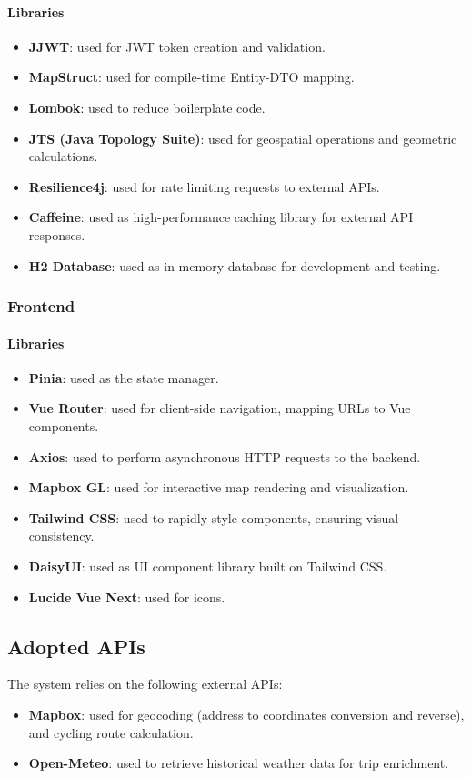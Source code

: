 \paragraph{Libraries}
\begin{itemize}
    \item \textbf{JJWT}: used for JWT token creation and validation.
    \item \textbf{MapStruct}: used for compile-time Entity-DTO mapping.
    \item \textbf{Lombok}: used to reduce boilerplate code.
    \item \textbf{JTS (Java Topology Suite)}: used for geospatial operations and geometric calculations.
    \item \textbf{Resilience4j}: used for rate limiting requests to external APIs.
    \item \textbf{Caffeine}: used as high-performance caching library for external API responses.
    \item \textbf{H2 Database}: used as in-memory database for development and testing.
\end{itemize}

\subsubsection*{Frontend}
\paragraph{Libraries}
\begin{itemize}
    \item \textbf{Pinia}: used as the state manager.
    \item \textbf{Vue Router}: used for client-side navigation, mapping URLs to Vue components.
    \item \textbf{Axios}: used to perform asynchronous HTTP requests to the backend.
    \item \textbf{Mapbox GL}: used for interactive map rendering and visualization.
    \item \textbf{Tailwind CSS}: used to rapidly style components, ensuring visual consistency.
    \item \textbf{DaisyUI}: used as UI component library built on Tailwind CSS.
    \item \textbf{Lucide Vue Next}: used for icons.
\end{itemize}

\subsection{Adopted APIs}
The system relies on the following external APIs:
\begin{itemize}
    \item \textbf{Mapbox}: used for geocoding (address to coordinates conversion and reverse), and cycling route calculation.
    \item \textbf{Open-Meteo}: used to retrieve historical weather data for trip enrichment.
\end{itemize}